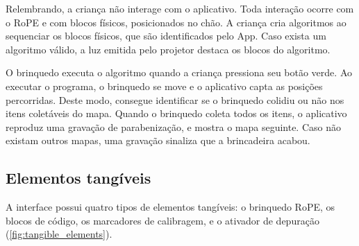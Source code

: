 Relembrando, a criança não interage com o aplicativo. Toda interação ocorre com o RoPE e com blocos físicos, posicionados no chão. A criança cria algoritmos ao sequenciar os blocos físicos, que são identificados pelo App. Caso exista um algoritmo válido, a luz emitida pelo projetor destaca os blocos do algoritmo.

O brinquedo executa o algoritmo quando a criança pressiona seu botão verde. Ao executar o programa, o brinquedo se move e o aplicativo capta as posições percorridas. Deste modo, consegue identificar se o brinquedo colidiu ou não nos itens coletáveis do mapa. Quando o brinquedo coleta todos os itens, o aplicativo reproduz uma gravação de parabenização, e mostra o mapa seguinte. Caso não existam outros mapas, uma gravação sinaliza que a brincadeira acabou.

\subsection{Elementos tangíveis}
A interface possui quatro tipos de elementos tangíveis: o brinquedo RoPE, os blocos de código, os marcadores de calibragem, e o ativador de depuração  (\autoref{fig:tangible_elements}).
